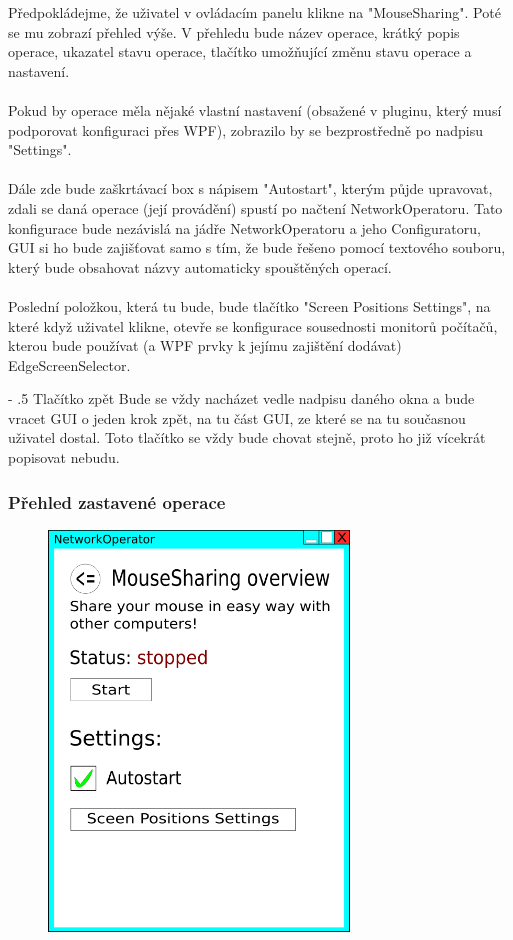 \documentclass[12pt]{article}
\makeatletter
\renewcommand\paragraph{%
    \@startsection{paragraph}{4}{0mm}%
       {-\baselineskip}%
       {.5\baselineskip}%
       {\normalfont\normalsize\bfseries}}
\makeatother
\begin{document}
Předpokládejme, že uživatel v ovládacím panelu klikne na "MouseSharing". Poté se mu zobrazí přehled výše. V přehledu bude název operace, krátký popis operace, ukazatel stavu operace, tlačítko umožňující změnu stavu operace a nastavení.\\\\
Pokud by operace měla nějaké vlastní nastavení (obsažené v pluginu, který musí podporovat konfiguraci přes WPF), zobrazilo by se bezprostředně po nadpisu "Settings".\\\\
Dále zde bude zaškrtávací box s nápisem "Autostart", kterým půjde upravovat, zdali se daná operace (její provádění) spustí po načtení NetworkOperatoru. Tato konfigurace bude nezávislá na jádře NetworkOperatoru a jeho Configuratoru, GUI si ho bude zajišťovat samo s tím, že bude řešeno pomocí textového souboru, který bude obsahovat názvy automaticky spouštěných operací.\\\\
Poslední položkou, která tu bude, bude tlačítko "Screen Positions Settings", na které když uživatel klikne, otevře se konfigurace sousednosti monitorů počítačů, kterou bude používat (a WPF prvky k jejímu zajištění dodávat) EdgeScreenSelector.

\paragraph{Tlačítko zpět}
Bude se vždy nacházet vedle nadpisu daného okna a bude vracet GUI o jeden krok zpět, na tu část GUI, ze které se na tu současnou uživatel dostal. Toto tlačítko se vždy bude chovat stejně, proto ho již vícekrát popisovat nebudu.

\subsubsection{Přehled zastavené operace}
\begin{figure}[H]
\includegraphics[width=8cm]{gui4-mousesahring-overview-stopped.png}
\centering
\end{figure}
\end{document}
